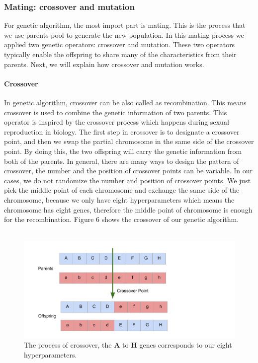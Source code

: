 \documentclass[12pt]{article}
\begin{document}
\subsubsection{Mating: crossover and mutation}
For genetic algorithm, the most import part is mating. This is the process that we use parents pool to generate the new population. In this mating process we applied two genetic operators: crossover and mutation. These two operators typically enable the offspring to share many of the characteristics from their parents. Next, we will explain how crossover and mutation works.
\paragraph{Crossover}
In genetic algorithm, crossover can be also called as recombination. This means crossover is used to combine the genetic information of two parents. This operator is inspired by the crossover process which happens during sexual reproduction in biology. The first step in crossover is to designate a crossover point, and then we swap the partial chromosome in the same side of the crossover point. By doing this, the two offspring will carry the genetic information from both of the parents. In general, there are many ways to design the pattern of crossover, the number and the position of crossover points can be variable. In our cases, we do not randomize the number and position of crossover points. We just pick the middle point of each chromosome and exchange the same side of the chromosome, because we only have eight hyperparameters which means the chromosome has eight genes, therefore the middle point of chromosome is enough for the recombination. Figure 6 shows the crossover of our genetic algorithm.\\
~\\
\begin{figure}
\begin{center}
\includegraphics[width =7.2in]{crossover.png}
\caption{The process of crossover, the \textbf{A} to \textbf{H} genes corresponds to our eight hyperparameters.}
\end{center}
\label{fig:pic6}
\end{figure}
\end{document}
